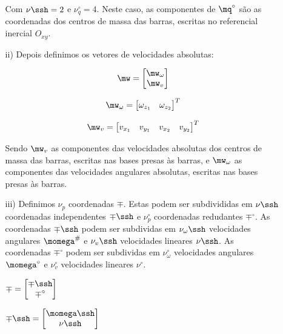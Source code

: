 \begin{itemize}
\begin{itemize}
	Com $\nu\ssh = 2$ e $\nu_q^\circ = 4$. Neste caso, as componentes de $\mq^\circ$ s\~ao as coordenadas dos centros de massa das barras, escritas no referencial 	inercial $O_{xy}$. \\
	
	\item[ii)] Depois definimos os vetores de velocidades absolutas:
	
	$$ \mw =
	\begin{bmatrix}
	\mw_\omega \\
	\mw_v
	\end{bmatrix}
	$$
	
	\begin{equation}
	\mw_\omega = \begin{bmatrix}
	\omega_{z_1} & \omega_{z_2}
	\end{bmatrix}^T
	\end{equation}
	
	\begin{equation}
	\mw_v = \begin{bmatrix}
	v_{x_1} & v_{y_1} & v_{x_2} & v_{y_2}
	\end{bmatrix}^T
	\end{equation}
	
	Sendo $\mw_v$ as componentes das velocidades absolutas dos centros de massa das barras, escritas nas bases presas às barras, e $\mw_\omega$ as componentes das velocidades angulares absolutas, escritas nas bases presas às barras. \\
	
	\item[iii)] Definimos $\nu_p$ coordenadas  $\mp$. Estas podem ser subdivididas em $\nu\ssh$ coordenadas independentes $\mp\ssh$ e $\nu_p^\circ$ coordenadas redudantes $\mp^\circ$. As coordenadas $\mp\ssh$ podem ser subdividas em $\nu_\omega\ssh$ velocidades angulares $\momega^{\#}$ e $\nu_v\ssh$ velocidades lineares $\mathbb{\nu}\ssh$. As coordenadas $\mp^\circ$ podem ser subdividas em $\nu_\omega^\circ$ velocidades angulares $\momega^\circ$ e $\nu_v^\circ$ velocidades lineares $\mathbb{\nu}^\circ$.
	
	
	\begin{multicols}{3}
	$ \mp = \begin{bmatrix}
	\mp\ssh \\
	\mp^\circ
	\end{bmatrix} $

	$ \mp\ssh = \begin{bmatrix}
	\momega\ssh \\
	\mathbb{\nu}\ssh
	\end{bmatrix} $


\end{multicols}
\end{itemize}
\end{itemize}
